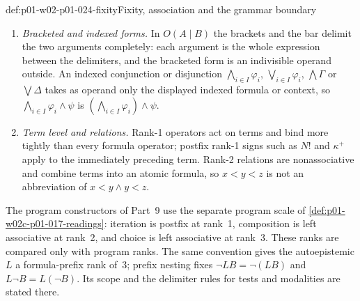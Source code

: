 \begin{hbconvention}{def:p01-w02-p01-024-fixity}{Fixity, association and the grammar boundary}
\begin{enumerate}
  In the untyped and simply typed \(\lambda\)-calculi of
  \cref{sec:p07-lambda-calculi-and-type-theories} application binds more
  tightly than abstraction, so \(\lambda x.MN\) is \(\lambda x.(MN)\).
  Where the active grammar states no such rule, the binder is a rank-3
  prefix operator and clause 4 applies.
\item \emph{Bracketed and indexed forms.}  In \(O(A\mid B)\) the
  brackets and the bar delimit the two arguments completely: each argument
  is the whole expression between the delimiters, and the bracketed form is
  an indivisible operand outside.  An indexed conjunction or disjunction
  \(\bigwedge_{i\in I}\varphi_i\), \(\bigvee_{i\in I}\varphi_i\),
  \(\bigwedge\Gamma\) or \(\bigvee\Delta\) takes as operand only the
  displayed indexed formula or context, so
  \(\bigwedge_{i\in I}\varphi_i\land\psi\) is
  \((\bigwedge_{i\in I}\varphi_i)\land\psi\).
\item \emph{Term level and relations.}  Rank-1 operators act on terms and
  bind more tightly than every formula operator; postfix rank-1 signs such
  as \(N!\) and \(\kappa^+\) apply to the immediately preceding term.
  Rank-2 relations are nonassociative and combine terms into an atomic
  formula, so \(x<y<z\) is not an abbreviation of
  \(x<y\land y<z\).
\end{enumerate}
\end{hbconvention}

The program constructors of Part~9 use the separate program scale of
\cref{def:p01-w02c-p01-017-readings}: iteration is postfix at rank~1,
composition is left associative at rank~2, and choice is left associative
at rank~3.  These ranks are compared only with program ranks.  The same
convention gives the autoepistemic \(L\) a formula-prefix rank of~3;
prefix nesting fixes \(\neg LB=\neg(LB)\) and
\(L\neg B=L(\neg B)\).  Its scope and the delimiter rules for tests
and modalities are stated there.

